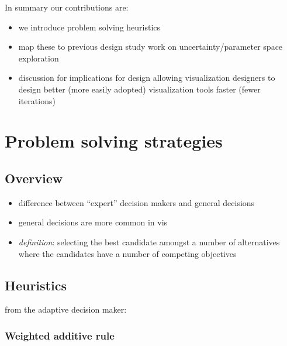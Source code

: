 In summary our contributions are:

\begin{itemize}
\tightlist
\item
  we introduce problem solving heuristics
\item
  map these to previous design study work on uncertainty/parameter space
  exploration
\item
  discussion for implications for design allowing visualization
  designers to design better (more easily adopted) visualization tools
  faster (fewer iterations)
\end{itemize}



\section{Problem solving strategies}\label{problem-solving-strategies}

\subsection{Overview}\label{overview}

\begin{itemize}
\tightlist
\item
  difference between ``expert'' decision makers and general decisions
\item
  general decisions are more common in vis
\item
  \emph{definition}: selecting the best candidate amongst a number of
  alternatives where the candidates have a number of competing
  objectives
\end{itemize}

\subsection{Heuristics}\label{heuristics}

from the adaptive decision maker:

\subsubsection{Weighted additive rule}\label{weighted-additive-rule}

